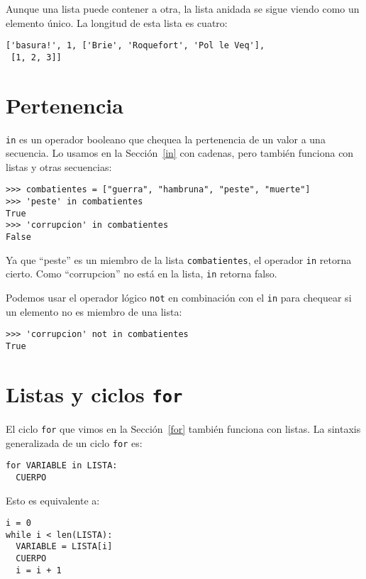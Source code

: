 Aunque una lista puede contener a otra, la lista anidada se sigue
viendo como un elemento único. La longitud de esta lista es cuatro:
\begin{lstlisting}
['basura!', 1, ['Brie', 'Roquefort', 'Pol le Veq'], 
 [1, 2, 3]]
\end{lstlisting}

\section{Pertenencia}

  

\texttt{in} es un operador booleano que chequea la pertenencia de
un valor a una secuencia. Lo usamos en la Sección~\ref{in} con cadenas,
pero también funciona con listas y otras secuencias:
\begin{lstlisting}
>>> combatientes = ["guerra", "hambruna", "peste", "muerte"]
>>> 'peste' in combatientes
True
>>> 'corrupcion' in combatientes
False
\end{lstlisting}

Ya que ``peste'' es un miembro de la lista \texttt{combatientes},
el operador \texttt{in} retorna cierto. Como ``corrupcion'' no está
en la lista, \texttt{in} retorna falso.

Podemos usar el operador lógico \texttt{not} en combinación con el
\texttt{in} para chequear si un elemento no es miembro de una lista:
\begin{lstlisting}
>>> 'corrupcion' not in combatientes
True
\end{lstlisting}

\section{Listas y ciclos \texttt{for}}

  

El ciclo \texttt{for} que vimos en la Sección~\ref{for} también
funciona con listas. La sintaxis generalizada de un ciclo \texttt{for}
es:
\begin{lstlisting}
for VARIABLE in LISTA:
  CUERPO
\end{lstlisting}

Esto es equivalente a:
\begin{lstlisting}
i = 0
while i < len(LISTA):
  VARIABLE = LISTA[i]
  CUERPO
  i = i + 1
\end{lstlisting}


